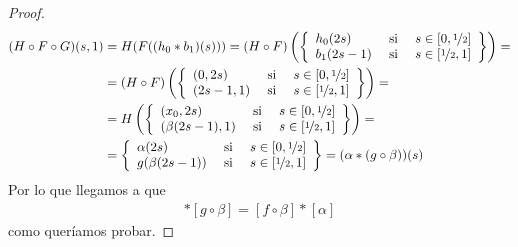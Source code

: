 \begin{lema}
\begin{proof}
        \begin{align*}
            (H\circ F \circ G) (s,1) &= H(F((h_0\ast b_1)(s))) = (H\circ F)\left(\left\{
                \begin{array}{l c c}
                    h_0(2s) & \text{ si } & s\in [0, \nicefrac{1}{2}]\\
                    b_1(2s-1) & \text{ si } & s \in [\nicefrac{1}{2}, 1]
                \end{array}
            \right\}\right) = \\
            &= (H\circ F) \left(\left\{
                \begin{array}{l c c}
                    (0,2s) & \text{ si } & s\in [0, \nicefrac{1}{2}]\\
                    (2s-1,1) & \text{ si } & s \in [\nicefrac{1}{2}, 1]
                \end{array}
            \right\}\right) = \\
            &= H \left(\left\{
                \begin{array}{l c c}
                    (x_0, 2s) & \text{ si } & s\in [0, \nicefrac{1}{2}]\\
                    (\beta(2s-1), 1) & \text{ si } & s \in [\nicefrac{1}{2}, 1]
                \end{array}
            \right\}\right) = \\
            &= \left\{
                \begin{array}{l c c}
                    \alpha(2s) & \text{ si } & s\in [0, \nicefrac{1}{2}]\\
                    g(\beta(2s-1)) & \text{ si } & s \in [\nicefrac{1}{2}, 1]
                \end{array}
            \right\} = (\alpha \ast (g\circ \beta))(s)
        \end{align*}
        Por lo que llegamos a que
        \begin{gather*}
            [\alpha]\ast [g\circ \beta] = [f\circ \beta] \ast [\alpha]
        \end{gather*}
        como queríamos probar.
    \end{proof}
\end{lema}

